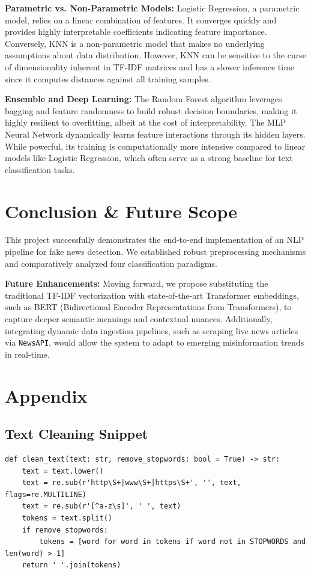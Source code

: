 \documentclass[conference]{IEEEtran}
\begin{document}
\textbf{Parametric vs. Non-Parametric Models:} Logistic Regression, a parametric model, relies on a linear combination of features. It converges quickly and provides highly interpretable coefficients indicating feature importance. Conversely, KNN is a non-parametric model that makes no underlying assumptions about data distribution. However, KNN can be sensitive to the curse of dimensionality inherent in TF-IDF matrices and has a slower inference time since it computes distances against all training samples.

\textbf{Ensemble and Deep Learning:} The Random Forest algorithm leverages bagging and feature randomness to build robust decision boundaries, making it highly resilient to overfitting, albeit at the cost of interpretability. The MLP Neural Network dynamically learns feature interactions through its hidden layers. While powerful, its training is computationally more intensive compared to linear models like Logistic Regression, which often serve as a strong baseline for text classification tasks.

\section{Conclusion \& Future Scope}
This project successfully demonstrates the end-to-end implementation of an NLP pipeline for fake news detection. We established robust preprocessing mechanisms and comparatively analyzed four classification paradigms. 

\textbf{Future Enhancements:} 
Moving forward, we propose substituting the traditional TF-IDF vectorization with state-of-the-art Transformer embeddings, such as BERT (Bidirectional Encoder Representations from Transformers), to capture deeper semantic meanings and contextual nuances. Additionally, integrating dynamic data ingestion pipelines, such as scraping live news articles via \texttt{NewsAPI}, would allow the system to adapt to emerging misinformation trends in real-time.

\section*{Appendix}
\subsection{Text Cleaning Snippet}
\begin{lstlisting}
def clean_text(text: str, remove_stopwords: bool = True) -> str:
    text = text.lower()
    text = re.sub(r'http\S+|www\S+|https\S+', '', text, flags=re.MULTILINE)
    text = re.sub(r'[^a-z\s]', ' ', text)
    tokens = text.split()
    if remove_stopwords:
        tokens = [word for word in tokens if word not in STOPWORDS and len(word) > 1]
    return ' '.join(tokens)
\end{lstlisting}
\end{document}

